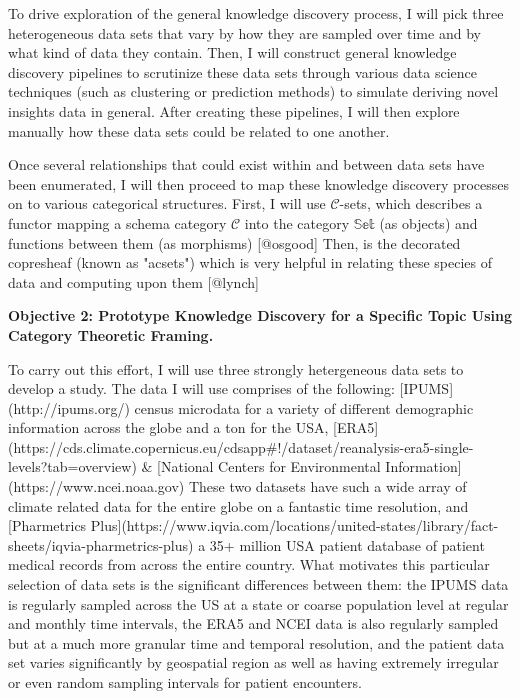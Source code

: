 \documentclass[11pt]{extarticle}
\begin{document}
To drive exploration of the general knowledge discovery process, I will pick three heterogeneous data sets that vary by how they are sampled over time and by what kind of data they contain. 
Then, I will construct general knowledge discovery pipelines to scrutinize these data sets through various data science techniques (such as clustering or prediction methods) to simulate deriving novel insights data in general.
After creating these pipelines, I will then explore manually how these data sets could be related to one another.

Once several relationships that could exist within and between data sets have been enumerated, I will then proceed to map these knowledge discovery processes on to various categorical structures.
First, I will use $\mathscr{C}$-sets, which describes a functor mapping a schema category $\mathscr{C}$ into the category $\mathbb{Set}$ (as objects) and functions between them (as morphisms) [@osgood] %
Then, is the decorated copresheaf (known as "acsets") which is very helpful in relating these species of data and computing upon them [@lynch]

\textbf{Objective 2: Prototype Knowledge Discovery for a Specific Topic Using Category Theoretic Framing.}


To carry out this effort, I will use three strongly hetergeneous data sets to develop a study. 
The data I will use comprises of the following: [IPUMS](http://ipums.org/) census microdata for a variety of different demographic information across the globe and a ton for the USA, [ERA5](https://cds.climate.copernicus.eu/cdsapp#!/dataset/reanalysis-era5-single-levels?tab=overview) & [National Centers for Environmental Information](https://www.ncei.noaa.gov) These two datasets have such a wide array of climate related data for the entire globe on a fantastic time resolution, and [Pharmetrics Plus](https://www.iqvia.com/locations/united-states/library/fact-sheets/iqvia-pharmetrics-plus) a 35+ million USA patient database of patient medical records from across the entire country.
What motivates this particular selection of data sets is the significant differences between them: the IPUMS data is regularly sampled across the US at a state or coarse population level at regular and monthly time intervals, the ERA5 and NCEI data is also regularly sampled but at a much more granular time and temporal resolution, and the patient data set varies significantly by geospatial region as well as having extremely irregular or even random sampling intervals for patient encounters.
\end{document}
